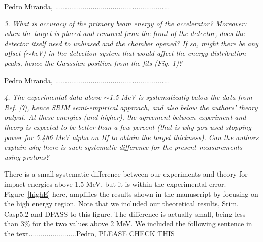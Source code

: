\documentclass[a4paper,10pt]{article}
\begin{document}
\vspace{0.1cm}
{\color{red} Pedro Miranda, ..........................................................}
\vspace{0.2cm}

\vspace{0.25cm}
\textsl{3. What is accuracy of the primary beam energy of the accelerator?
Moreover: when the target is placed and removed from the front of the
detector, does the detector itself need to unbiased and the chamber
opened? If so, might there be any offset ($\sim$keV) in the detection
system that would affect the energy distribution peaks, hence the
Gaussian position from the fits (Fig. 1)?}

\vspace{0.1cm}
{\color{red} Pedro Miranda, ..........................................................}
\vspace{0.2cm}

\vspace{0.25cm}
\textsl{4. The experimental data above $\sim$1.5 MeV is systematically 
below the data from Ref. [7], hence SRIM semi-empirical approach, and 
also below the authors’ theory output. At these energies (and higher), 
the agreement between experiment and theory is expected to be better than
a few percent (that is why you used stopping power for 5.486 MeV alpha
on Hf to obtain the target thickness). Can the authors explain why
there is such systematic difference for the present measurements using
protons?}

{\color{red} There is a small systematic difference between our experiments and theory for impact energies above 1.5 MeV, but it is within the experimental error. Figure~\ref{highE} here, amplifies the results shown in the manuscript by focusing  on the high energy region. Note that we included our theoretical results, Srim, Casp5.2 and DPASS to this figure. The difference is actually small, being less than $3\%$ for the two values above 2 MeV. We included the following sentence in the text........................Pedro, PLEASE CHECK THIS}
\end{document}
